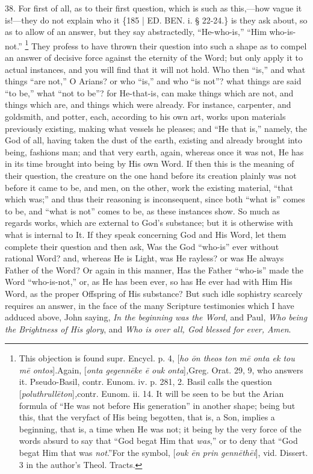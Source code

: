 38. For first of all, as to
their first question, which is such as this,—how vague it is!—they
do not explain who it \{185 | ED. BEN. i. § 22-24.\} is
they ask about, so as to allow of an answer, but they say
abstractedly, ``He-who-is,'' ``Him who-is-not.'' \footnote{This objection is found supr. Encycl. p. 4, [\emph{ho \={o}n theos ton
m\={e} onta ek tou m\={e} ontos}].\emph{}Again, [\emph{onta
gegenn\={e}ke \={e} ouk onta}]\emph{,}Greg. Orat. 29, 9, who
answers it. Pseudo-Basil, contr. Eunom. iv. p. 281, 2. Basil calls the
question [\emph{poluthrull\={e}ton}]\emph{,}contr. Eunom. ii. 14.
It will be seen to be but the Arian formula of ``He was not before His
generation'' in another shape; being but this, that the very\emph{}fact
of His being begotten, that is, a Son, implies a beginning, that is, a
time when He was not; it being by the very force of the words absurd
to say that ``God begat Him that \emph{was},'' or to deny that ``God
begat Him that was \emph{not}.''\emph{}For the symbol, [\emph{ouk \={e}n
prin genn\={e}th\={e}i}], vid. Dissert. 3 in the author's
Theol. Tracts.} They profess to have thrown their question into such a shape
as to compel an answer of decisive force against the eternity of the
Word; but only apply it to actual instances, and you will find that it
will not hold. Who then ``is,'' and what things ``are not,'' O Arians? or
who ``is,'' and who ``is not''? what things are said ``to be,'' what ``not to
be''? for He-that-is, can make things which are not, and things which
are, and things which were already. For instance, carpenter, and
goldsmith, and potter, each, according to his own art, works upon
materials previously existing, making what vessels he pleases; and ``He
that is,'' namely, the God of all, having taken the dust of the earth,
existing and already brought into being, fashions man; and that very
earth, again, whereas once it was not, He has in its time brought into
being by His own Word. If then this is the meaning of their question,
the creature on the one hand before its creation plainly was not
before it came to be, and men, on the other, work the existing
material, ``that which was;'' and thus their reasoning is inconsequent,
since both ``what is'' comes to be, and ``what is not'' comes to be, as
these instances show. So much as regards works, which are external to
God's substance; but it is otherwise with what is internal to It. If
they speak concerning God and His Word, let them complete their
question and then ask, Was the God ``who-is'' ever without rational
Word? and, whereas He is Light, was He rayless? or was He always
Father of the Word? Or again in this manner, Has the Father ``who-is''
made the Word ``who-is-not,'' or, as He has been ever, so has He ever
had with Him His Word, as the proper Offspring of His substance? But
such idle sophistry scarcely requires an answer, in the face of the
many Scripture testimonies which I have adduced above, John saying, \emph{In
the beginning was the Word}, and Paul, \emph{Who being the Brightness
of His glory}, and \emph{Who is over all, God blessed for ever, Amen}.


